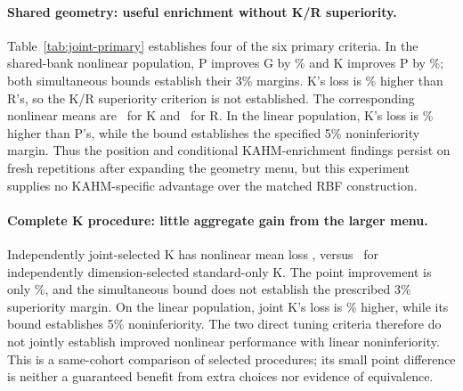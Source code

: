 \begin{table}[tbp]
\centering\small
\setlength{\tabcolsep}{4pt}

\caption{Six primary comparisons in the joint-selection experiment.
The first four use P's selected common bank; the last two compare
independently selected K procedures on the same cohort. Gain is
$100(1-\overline L_{\rm candidate}/\overline L_{\rm reference})$,
so a negative value means higher candidate loss. $U$ is the
simultaneous upper bound for the margin-adjusted paired difference;
the criterion is established only if $U<0$. Nonlinear criteria
require 3\% superiority and linear criteria allow 5\% noninferiority.}
\label{tab:joint-primary}
\end{table}

\paragraph{Shared geometry: useful enrichment without K/R superiority.}
Table~\ref{tab:joint-primary} establishes four of the six primary
criteria. In the shared-bank nonlinear population, P improves G
by \JSGainPG\% and K improves P by \JSGainKP\%; both simultaneous
bounds establish their 3\% margins. K's loss is
\JSRelativeLossChangeKR\% higher than R's, so the K/R superiority
criterion is not established. The corresponding nonlinear means
are \JSLossSharedNonlinearK\ for K and
\JSLossSharedNonlinearR\ for R. In the linear population, K's
loss is \JSRelativeLossChangeLinearKP\% higher than P's, while
the bound establishes the specified 5\% noninferiority margin.
Thus the position and conditional KAHM-enrichment findings persist
on fresh repetitions after expanding the geometry menu, but this
experiment supplies no KAHM-specific advantage over the matched RBF
construction.

\paragraph{Complete K procedure: little aggregate gain from the larger menu.}
Independently joint-selected K has nonlinear mean loss
\JSLossIndependentNonlinearK, versus
\JSLossStandardIndependentNonlinearK\ for independently
dimension-selected standard-only K. The point improvement is only
\JSGainJointKNonlinear\%, and the simultaneous bound does not
establish the prescribed 3\% superiority margin. On the linear
population, joint K's loss is
\JSRelativeLossChangeJointKLinear\% higher, while its bound
establishes 5\% noninferiority. The two direct tuning criteria
therefore do not jointly establish improved nonlinear performance
with linear noninferiority. This is a same-cohort comparison of selected
procedures; its small point difference is neither a guaranteed
benefit from extra choices nor evidence of equivalence.

